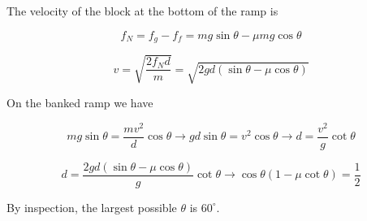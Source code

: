 \begin{solution}
The velocity of the block at the bottom of the ramp is

$$f_N = f_g - f_f = mg\sin\theta - \mu mg\cos\theta$$

$$v = \sqrt{\frac{2f_Nd}{m}} = \sqrt{2gd(\sin\theta-\mu\cos\theta)}$$

On the banked ramp we have

$$mg\sin\theta = \frac{mv^2}{d}\cos\theta\longrightarrow gd\sin\theta = v^2\cos\theta\longrightarrow d = \frac{v^2}{g}\cot\theta$$

$$d = \frac{2gd(\sin\theta-\mu\cos\theta)}{g}\cot\theta\longrightarrow\cos\theta(1 - \mu\cot\theta) = \frac{1}{2}$$

By inspection, the largest possible $\theta$ is $\boxed{60^{\circ}}$.
\end{solution}